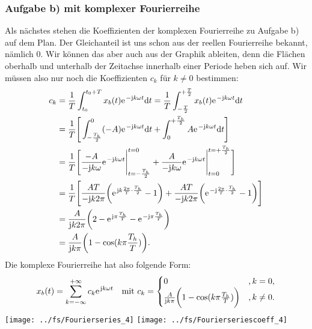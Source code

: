 \documentclass[11pt,a4paper,DIV=12]{scrartcl}
\newcommand{\diff}{\mathrm{d}}
\begin{document}
\subsubsection*{Aufgabe b) mit komplexer Fourierreihe}
Als nächstes stehen die Koeffizienten der komplexen Fourierreihe zu Aufgabe b) auf dem Plan. Der Gleichanteil ist uns schon aus der reellen Fourierreihe bekannt, nämlich $0$. Wir können das aber auch aus der Graphik ableiten, denn die Flächen oberhalb und unterhalb der Zeitachse innerhalb einer Periode heben sich auf. Wir müssen also nur noch die Koeffizienten $c_k$ für $k\neq 0$ bestimmen:
\begin{align}
	c_k&=\frac{1}{T}\int_{t_0}^{t_0+T}x_{b}(t)\e^{-\im k \omega t}\diff t=\frac{1}{T}\int_{-\frac{T}{2}}^{+\frac{T}{2}}x_{b}(t)\e^{-\im k \omega t}\diff t \nonumber \\
	&=\frac{1}{T}\Bigg [ \int_{-\frac{T_h}{2}}^{0}(-A)\e^{-\im k \omega t}\diff t+\int_{0}^{+\frac{T_h}{2}}A\e^{-\im k \omega t}\diff t \Bigg ] \nonumber \\
	&=\frac{1}{T}\Bigg [ \frac{-A}{-\im k \omega}\e^{-\im k \omega t}\Bigg |_{t=-\frac{T_h}{2}}^{t=0}+\frac{A}{-\im k \omega}\e^{-\im k \omega t}\Bigg |_{t=0}^{t=+\frac{T_h}{2}}\Bigg ] \nonumber \\
	&=\frac{1}{T}\Bigg [ \frac{AT}{-\im k 2\pi }\bigg (\e^{\im k \frac{2\pi}{T}\cdot \frac{T_h}{2}}-1\bigg )+\frac{AT}{-\im k 2\pi}\bigg (\e^{-\im\frac{2\pi}{T}\cdot\frac{T_h}{2}}-1\bigg )\Bigg ]\nonumber \\
	&=\frac{A}{\im k 2 \pi}\bigg (2 -\e^{\im\pi\frac{T_h}{T}}-\e^{-\im\pi\frac{T_h}{T}} \bigg )\nonumber \\
	\label{eq:CKTaskBComplex}
	&=\frac{A}{\im k \pi}\bigg ( 1-\cos(k\pi\frac{T_h}{T})\bigg ).
\end{align}
Die komplexe Fourierreihe hat also folgende Form:
\begin{align}
	x_{b}(t)=\sum_{k=-\infty}^{+\infty}c_k\e^{\im k \omega t}\quad \text{mit }c_k=\begin{cases}
		0 &, k= 0, \\
		\frac{A}{\im k \pi}\bigg (1-\cos(k \pi \frac{T_h}{T})\bigg ) &, k\neq 0.
	\end{cases}
\end{align}
\newpage
\texttt{[image: ../fs/Fourierseries\_4]}
\texttt{[image: ../fs/Fourierseriescoeff\_4]}
\newpage
\end{document}
